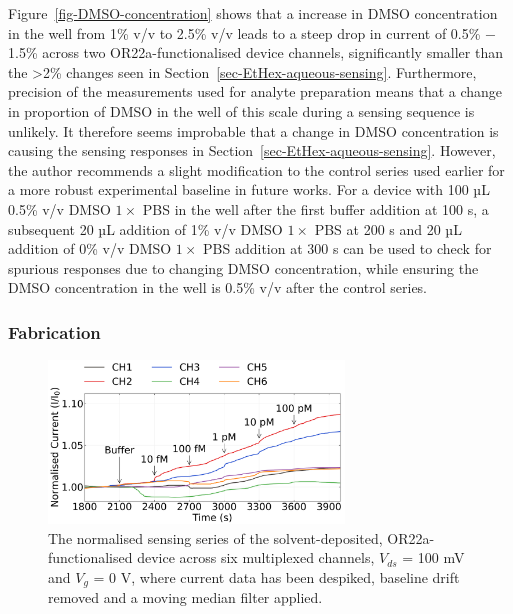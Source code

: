 \documentclass[
  a4paper,
]{scrbook}
\begin{document}
Figure~\ref{fig-DMSO-concentration} shows that a increase in DMSO
concentration in the well from 1\% v/v to 2.5\% v/v leads to a steep
drop in current of 0.5\% \(-\) 1.5\% across two OR22a-functionalised
device channels, significantly smaller than the \textgreater2\% changes
seen in Section~\ref{sec-EtHex-aqueous-sensing}. Furthermore, precision
of the measurements used for analyte preparation means that a change in
proportion of DMSO in the well of this scale during a sensing sequence
is unlikely. It therefore seems improbable that a change in DMSO
concentration is causing the sensing responses in
Section~\ref{sec-EtHex-aqueous-sensing}. However, the author recommends
a slight modification to the control series used earlier for a more
robust experimental baseline in future works. For a device with 100 µL
0.5\% v/v DMSO \(1 \times\) PBS in the well after the first buffer
addition at 100 s, a subsequent 20 µL addition of 1\% v/v DMSO
\(1 \times\) PBS at 200 s and 20 µL addition of 0\% v/v DMSO
\(1 \times\) PBS addition at 300 s can be used to check for spurious
responses due to changing DMSO concentration, while ensuring the DMSO
concentration in the well is 0.5\% v/v after the control series.

\hypertarget{fabrication}{%
\subsubsection*{Fabrication}\label{fabrication}}

\begin{figure}

{\centering \includegraphics[width=0.7\textwidth,height=\textheight]{figures/ch8/NTQ25C5_OR22a_sample_220126_filtered_detrend_trunc_arrows_normalised.png}

}

\caption{\label{fig-solvent-deposited-sensing}The normalised sensing
series of the solvent-deposited, OR22a-functionalised device across six
multiplexed channels, \(V_{ds}\) = 100 mV and \(V_g\) = 0 V, where
current data has been despiked, baseline drift removed and a moving
median filter applied.}

\end{figure}
\end{document}
